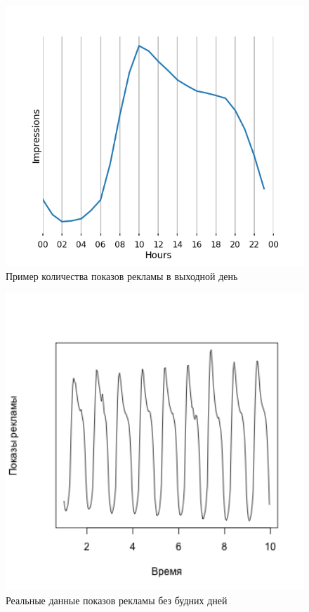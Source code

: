 \documentclass[%
12pt,
master,  %
natbib,      %
subf,        %
substylefile = spbu.rtx,
href,        %
colorlinks,  %
]{disser}
\begin{document}
\begin{figure}[!hhh]
	\begin{center}
		\includegraphics[width=12cm]{examples_weekend}
	\end{center}
	\vspace{-5mm}\caption{Пример количества показов рекламы в выходной день}
	\label{fig:examples_weekend}
\end{figure}

\begin{figure}[!hhh]
	\begin{center}
		\includegraphics[width=12cm]{examples_long_weekends}
	\end{center}
	\vspace{-5mm}\caption{Реальные данные показов рекламы без будних дней}
	\label{fig:examples_long_weekends}
\end{figure}
\end{document}
